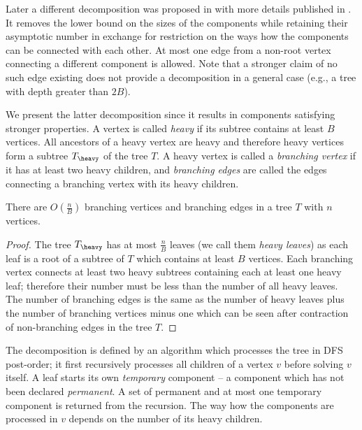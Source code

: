 Later a different decomposition was proposed in \cite{farzan2008uniform} with more details published in \cite{farzan2014uniform}.
It removes the lower bound on the sizes of the components while retaining their asymptotic number in exchange for restriction on the ways how the components can be connected with each other.
At most one edge from a non-root vertex connecting a different component is allowed.
Note that a stronger claim of no such edge existing does not provide a decomposition in a general case (e.g., a tree with depth greater than $2 B$).

\bigbreak

We present the latter decomposition since it results in components satisfying stronger properties.
A vertex is called \emph{heavy} if its subtree contains at least $B$ vertices.
All ancestors of a heavy vertex are heavy and therefore heavy vertices form a subtree $T_{\heavy}$ of the tree $T$.
A heavy vertex is called a \emph{branching vertex} if it has at least two heavy children, and \emph{branching edges} are called the edges connecting a branching vertex with its heavy children.

\begin{lemma}\label{l:no-branching}
	There are $O\left(\frac{n}{B}\right)$ branching vertices and branching edges in a tree $T$ with $n$ vertices.
\end{lemma}
\begin{proof}
	The tree $T_{\heavy}$ has at most $\frac{n}{B}$ leaves (we call them \emph{heavy leaves}) as each leaf is a root of a subtree of $T$ which contains at least $B$ vertices.
	Each branching vertex connects at least two heavy subtrees containing each at least one heavy leaf; therefore their number must be less than the number of all heavy leaves.
	The number of branching edges is the same as the number of heavy leaves plus the number of branching vertices minus one which can be seen after contraction of non-branching edges in the tree $T$.
\end{proof}

The decomposition is defined by an algorithm which processes the tree in DFS post-order; it first recursively processes all children of a vertex $v$ before solving $v$ itself.
A leaf starts its own \emph{temporary} component -- a component which has not been declared \emph{permanent}.
A set of permanent and at most one temporary component is returned from the recursion.
The way how the components are processed in $v$ depends on the number of its heavy children.

